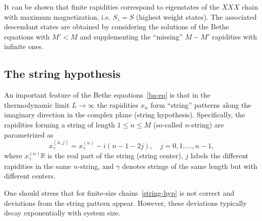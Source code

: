 \documentclass[twocolumn,superscriptaddress,prb,10pt]{revtex4-1}
\begin{document}
It can be shown that finite rapidities correspond to eigenstates of the 
$XXX$ chain with maximum magnetization, i.e. $S_z=S$ (highest weight states). 
The associated descendant states are obtained by considering the solutions of 
the Bethe equations with $M'<M$ and supplementing the ``missing'' $M-M'$ 
rapidities with infinite ones. 



\subsection{The string hypothesis}

An important feature of the Bethe equations~\eqref{ba-eq} is that in the 
thermodynamic limit $L\to\infty$ the rapidities ${x_\alpha}$ form 
``string'' patterns along the imaginary direction in the complex plane 
(string hypothesis). Specifically, the rapidities forming a string of 
length $1\le n\le M$ (so-called $n$-string) are parametrized as 
%
\begin{equation}
x_\gamma^{(n,j)}=x_\gamma^{(n)}-i(n-1-2j),\quad j=0,1,\dots,n-1,
\label{string-hyp}
\end{equation}
% 
where $x_\gamma^{(n)}\mathbb{R}$ is the real part of the string (string 
center), $j$ labels the different rapidities in the same $n$-string, and
$\gamma$ denotes strings of the same length but with different centers.

One should stress that for finite-size chains~\eqref{string-hyp} is not 
correct and deviations from the string pattern appear. However, these 
deviations typically decay exponentially with system size. 
\end{document}
